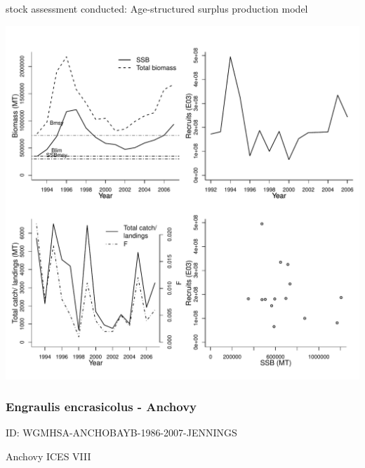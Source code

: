 stock assessment conducted: Age-structured surplus production model 
\begin{center}
\vspace{-0.2cm}\includegraphics[scale=0.65]{../tex/figures/plot-INIDEP-ARGANCHOSARG-1992-2007-Parma.pdf}
\end{center}

\newpage
\subsubsection{Engraulis encrasicolus - Anchovy}
ID: WGMHSA-ANCHOBAYB-1986-2007-JENNINGS

Anchovy ICES VIII 

